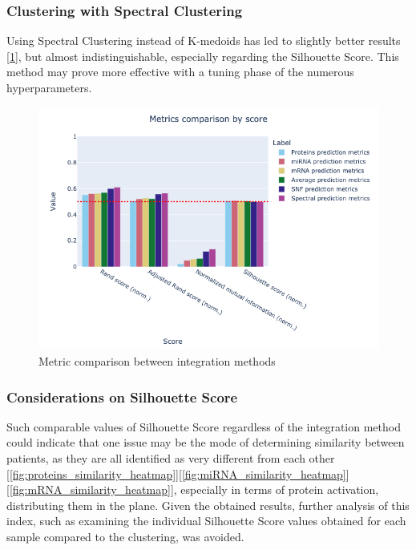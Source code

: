 \documentclass[12pt,a4paper]{article}
\begin{document}
\subsubsection{Clustering with Spectral Clustering}
Using Spectral Clustering instead of K-medoids has led to slightly better results [\ref{fig:metrics_comparison_by_score}], but almost indistinguishable, especially regarding the Silhouette Score. This method may prove more effective with a tuning phase of the numerous hyperparameters.

\begin{figure}[htbp!]
\begin{center}
\includegraphics[width=0.9\columnwidth]{./static/metrics_comparison_by_score.png}
\end{center}
\caption{Metric comparison between integration methods}
\label{fig:metrics_comparison_by_score}
\end{figure}

\subsubsection{Considerations on Silhouette Score}
Such comparable values of Silhouette Score regardless of the integration method could indicate that one issue may be the mode of determining similarity between patients, as they are all identified as very different from each other [\ref{fig:proteins_similarity_heatmap}][\ref{fig:miRNA_similarity_heatmap}][\ref{fig:mRNA_similarity_heatmap}], especially in terms of protein activation, distributing them in the plane. Given the obtained results, further analysis of this index, such as examining the individual Silhouette Score values obtained for each sample compared to the clustering, was avoided.
\end{document}
